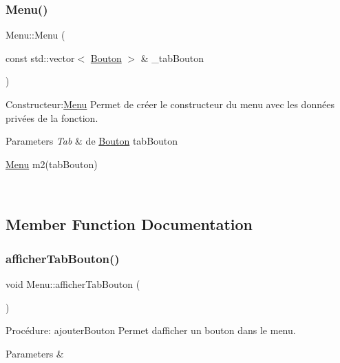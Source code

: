 \subsubsection{\texorpdfstring{Menu()}{Menu()}\hspace{0.1cm}{\footnotesize\ttfamily [3/3]}}
{\footnotesize\ttfamily Menu\+::\+Menu (\begin{DoxyParamCaption}\item[{const std\+::vector$<$ \hyperlink{classBouton}{Bouton} $>$ \&}]{\+\_\+tab\+Bouton }\end{DoxyParamCaption})}



Constructeur\+:\hyperlink{classMenu}{Menu} Permet de créer le constructeur du menu avec les données privées de la fonction. 


\begin{DoxyParams}{Parameters}
{\em Tab} & de \hyperlink{classBouton}{Bouton} tab\+Bouton 
\begin{DoxyCode}
\hyperlink{classMenu}{Menu} m2(tabBouton)
\end{DoxyCode}
 \\
\hline
\end{DoxyParams}


\subsection{Member Function Documentation}
\mbox{\label{classMenu_af01f5f26519658b6e0fd92fdb8eda6fe}} 
\subsubsection{\texorpdfstring{afficher\+Tab\+Bouton()}{afficherTabBouton()}}
{\footnotesize\ttfamily void Menu\+::afficher\+Tab\+Bouton (\begin{DoxyParamCaption}{ }\end{DoxyParamCaption})}



Procédure\+: ajouter\+Bouton Permet d\textquotesingle{}afficher\textquotesingle{} un bouton dans le menu. 


\begin{DoxyParams}{Parameters}
{\em } & \\
\hline
\end{DoxyParams}
\mbox{\label{classMenu_a429b2c8fcaed081553ce284ffa0637ab}} 
